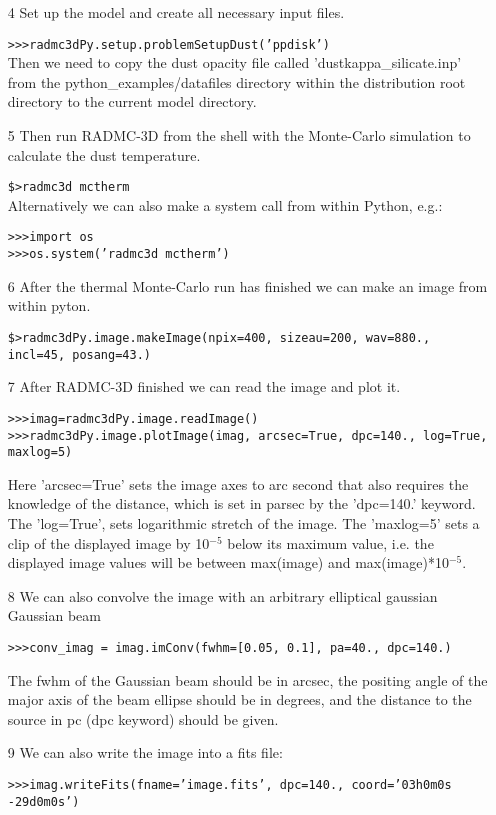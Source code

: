 \documentclass[12pt]{article}
\begin{document}
\begin{itemize}
\item[4] Set up the model and create all necessary input files.


{\tt>>>radmc3dPy.setup.problemSetupDust('ppdisk')}\\

Then we need to copy the dust opacity file called 'dustkappa\_silicate.inp' from the python\_examples/datafiles directory
within the distribution root directory to the current model directory. 

\item[5] Then run RADMC-3D from the shell with the Monte-Carlo simulation to calculate the dust temperature.

{\tt \$>radmc3d mctherm}\\

Alternatively we can also make a system call from within Python, e.g.:

{\tt>>>import os}\\
{\tt>>>os.system('radmc3d mctherm')}
\item[6] After the thermal Monte-Carlo run has finished we can make an image from within pyton. 

{\tt \$>radmc3dPy.image.makeImage(npix=400, sizeau=200, wav=880., incl=45, posang=43.)}\\
\item[7] After RADMC-3D finished we can read the image and plot it. 

{\tt>>>imag=radmc3dPy.image.readImage()}\\
{\tt>>>radmc3dPy.image.plotImage(imag, arcsec=True, dpc=140., log=True, maxlog=5)}

Here 'arcsec=True' sets the image axes to arc second that also requires the knowledge of the distance, 
which is set in parsec by the 'dpc=140.' keyword. The 'log=True', sets logarithmic stretch of the image.
The 'maxlog=5' sets a clip of the displayed image by 10$^{-5}$ below its maximum value, i.e. the
displayed image values will be between max(image) and max(image)*10$^{-5}$.

\item[8] We can also convolve the image with an arbitrary elliptical gaussian Gaussian beam

{\tt>>>conv\_imag = imag.imConv(fwhm=[0.05, 0.1], pa=40., dpc=140.)}

The fwhm of the Gaussian beam should be in arcsec,  the positing angle of the major axis of the beam ellipse
should be in degrees, and the distance to the source in pc (dpc keyword) should be given. 

\item[9] We can also write the image into a fits file:

{\tt>>>imag.writeFits(fname='image.fits', dpc=140., coord='03h0m0s -29d0m0s')}



\end{itemize}
\end{document}

